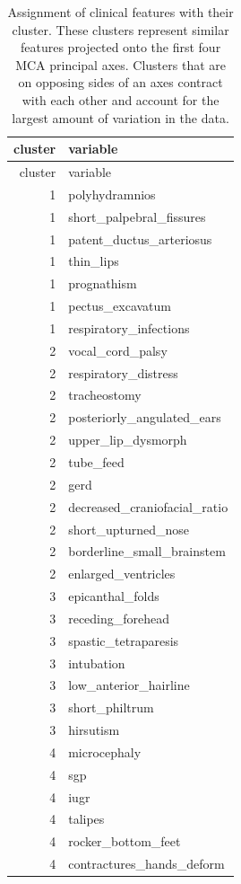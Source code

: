 \documentclass[
  letterpaper,
  DIV=11,
  numbers=noendperiod]{scrartcl}
\begin{document}
\hypertarget{tbl-profile}{}
\begin{longtable}[]{@{}rl@{}}
\caption{\label{tbl-profile}Assignment of clinical features with their
cluster. These clusters represent similar features projected onto the
first four MCA principal axes. Clusters that are on opposing sides of an
axes contract with each other and account for the largest amount of
variation in the data.}\tabularnewline
\toprule()
cluster & variable \\
\midrule()
\endfirsthead
\toprule()
cluster & variable \\
\midrule()
\endhead
1 & polyhydramnios \\
1 & short\_palpebral\_fissures \\
1 & patent\_ductus\_arteriosus \\
1 & thin\_lips \\
1 & prognathism \\
1 & pectus\_excavatum \\
1 & respiratory\_infections \\
2 & vocal\_cord\_palsy \\
2 & respiratory\_distress \\
2 & tracheostomy \\
2 & posteriorly\_angulated\_ears \\
2 & upper\_lip\_dysmorph \\
2 & tube\_feed \\
2 & gerd \\
2 & decreased\_craniofacial\_ratio \\
2 & short\_upturned\_nose \\
2 & borderline\_small\_brainstem \\
2 & enlarged\_ventricles \\
3 & epicanthal\_folds \\
3 & receding\_forehead \\
3 & spastic\_tetraparesis \\
3 & intubation \\
3 & low\_anterior\_hairline \\
3 & short\_philtrum \\
3 & hirsutism \\
4 & microcephaly \\
4 & sgp \\
4 & iugr \\
4 & talipes \\
4 & rocker\_bottom\_feet \\
4 & contractures\_hands\_deform \\

\end{longtable}
\end{document}
